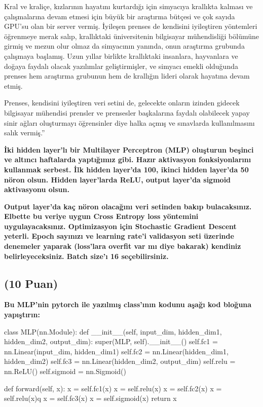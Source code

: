\documentclass[11pt]{article}
\begin{document}
Kral ve kraliçe, kızlarının hayatını kurtardığı için simyacıya krallıkta kalması ve çalışmalarına devam etmesi için büyük bir araştırma bütçesi ve çok sayıda GPU'su olan bir server vermiş. İyileşen prenses de kendisini iyileştiren yöntemleri öğrenmeye merak salıp, krallıktaki üniversitenin bilgisayar mühendisliği bölümüne girmiş ve mezun olur olmaz da simyacının yanında, onun araştırma grubunda çalışmaya başlamış. Uzun yıllar birlikte krallıktaki insanlara, hayvanlara ve doğaya faydalı olacak yazılımlar geliştirmişler, ve simyacı emekli olduğunda prenses hem araştırma grubunun hem de krallığın lideri olarak hayatına devam etmiş.

Prenses, kendisini iyileştiren veri setini de, gelecekte onların izinden gidecek bilgisayar mühendisi prensler ve prensesler başkalarına faydalı olabilecek yapay sinir ağları oluşturmayı öğrensinler diye halka açmış ve sınavlarda kullanılmasını salık vermiş.''

\textbf{İki hidden layer'lı bir Multilayer Perceptron (MLP) oluşturun beşinci ve altıncı haftalarda yaptığımız gibi. Hazır aktivasyon fonksiyonlarını kullanmak serbest. İlk hidden layer'da 100, ikinci hidden layer'da 50 nöron olsun. Hidden layer'larda ReLU, output layer'da sigmoid aktivasyonu olsun.}

\textbf{Output layer'da kaç nöron olacağını veri setinden bakıp bulacaksınız. Elbette bu veriye uygun Cross Entropy loss yöntemini uygulayacaksınız. Optimizasyon için Stochastic Gradient Descent yeterli. Epoch sayınızı ve learning rate'i validasyon seti üzerinde denemeler yaparak (loss'lara overfit var mı diye bakarak) kendiniz belirleyeceksiniz. Batch size'ı 16 seçebilirsiniz.}

\subsection{(10 Puan)} \textbf{Bu MLP'nin pytorch ile yazılmış class'ının kodunu aşağı kod bloğuna yapıştırın:}

\begin{python}
class MLP(nn.Module):
    def __init__(self, input_dim, hidden_dim1, hidden_dim2, output_dim):
        super(MLP, self).__init__()
        self.fc1 = nn.Linear(input_dim, hidden_dim1)
        self.fc2 = nn.Linear(hidden_dim1, hidden_dim2)
        self.fc3 = nn.Linear(hidden_dim2, output_dim)
        self.relu = nn.ReLU()
        self.sigmoid = nn.Sigmoid()
        
    def forward(self, x):
        x = self.fc1(x)
        x = self.relu(x)
        x = self.fc2(x)
        x = self.relu(x)q
        x = self.fc3(x)
        x = self.sigmoid(x)
        return x
\end{python}
\end{document}
